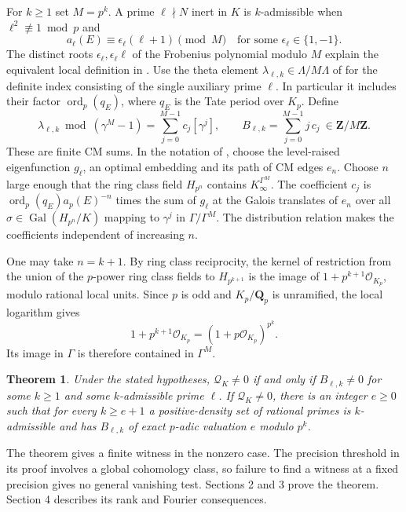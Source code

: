 \documentclass[11pt]{article}
\newtheorem{theorem}{Theorem}[section]
\newcommand{\Z}{\mathbf Z}
\newcommand{\Q}{\mathbf Q}
\newcommand{\Gal}{\operatorname{Gal}}
\newcommand{\ord}{\operatorname{ord}}
\begin{document}
For \(k\geq1\) set \(M=p^k\). A prime \(\ell\nmid N\) inert in \(K\) is \(k\)-admissible when \(\ell^2\not\equiv1\bmod p\) and
\[
             a_\ell(E)\equiv \epsilon_\ell(\ell+1)\pmod M
             \quad\text{for some }\epsilon_\ell\in\{1,-1\}.
\]
The distinct roots \(\epsilon_\ell,\epsilon_\ell\ell\) of the Frobenius polynomial modulo \(M\) explain the equivalent local definition in \cite[\S3.1]{FG}. Use the theta element \(\lambda_{\ell,k}\in\Lambda/M\Lambda\) of \cite[Def.~3.14]{FG} for the definite index consisting of the single auxiliary prime \(\ell\). In particular it includes their factor \(\ord_p(q_E)\), where \(q_E\) is the Tate period over \(K_p\). Define
\begin{equation}
 \lambda_{\ell,k}\bmod (\gamma^M-1)
     =\sum_{j=0}^{M-1}c_j[\gamma^j],
 \qquad
 B_{\ell,k}=\sum_{j=0}^{M-1}j\,c_j \ \in\Z/M\Z .
 \label{eq:moment}
\end{equation}
These are finite CM sums. In the notation of \cite[eqs.~(23)--(24)]{FG}, choose the level-raised eigenfunction \(g_\ell\), an optimal embedding and its path of CM edges \(e_n\). Choose \(n\) large enough that the ring class field \(H_{p^n}\) contains \(K_\infty^{\Gamma^M}\). The coefficient \(c_j\) is \(\ord_p(q_E)a_p(E)^{-n}\) times the sum of \(g_\ell\) at the Galois translates of \(e_n\) over all \(\sigma\in\Gal(H_{p^n}/K)\) mapping to \(\gamma^j\) in \(\Gamma/\Gamma^M\). The distribution relation makes the coefficients independent of increasing \(n\).

One may take \(n=k+1\). By ring class reciprocity, the kernel of restriction from the union of the \(p\)-power ring class fields to \(H_{p^{k+1}}\) is the image of \(1+p^{k+1}\mathcal O_{K_p}\), modulo rational local units. Since \(p\) is odd and \(K_p/\Q_p\) is unramified, the local logarithm gives
\[
 1+p^{k+1}\mathcal O_{K_p}=(1+p\mathcal O_{K_p})^{p^k}.
\]
Its image in \(\Gamma\) is therefore contained in \(\Gamma^M\).

\begin{theorem}\label{th:main}
Under the stated hypotheses, \(\mathcal Q_K\neq0\) if and only if \(B_{\ell,k}\neq0\) for some \(k\geq1\) and some \(k\)-admissible prime \(\ell\). If \(\mathcal Q_K\neq0\), there is an integer \(e\geq0\) such that for every \(k\geq e+1\) a positive-density set of rational primes is \(k\)-admissible and has \(B_{\ell,k}\) of exact \(p\)-adic valuation \(e\) modulo \(p^k\).
\end{theorem}

The theorem gives a finite witness in the nonzero case. The precision threshold in its proof involves a global cohomology class, so failure to find a witness at a fixed precision gives no general vanishing test. Sections 2 and 3 prove the theorem. Section 4 describes its rank and Fourier consequences.
\end{document}
